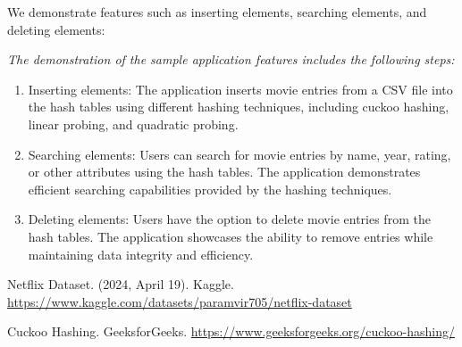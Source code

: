 \documentclass[12pt]{article}
\begin{document}
We demonstrate features such as inserting elements, searching elements, and deleting elements:

\textit{The demonstration of the sample application features includes the following steps:}

\begin{enumerate}
    \item Inserting elements: The application inserts movie entries from a CSV file into the hash tables using different hashing techniques, including cuckoo hashing, linear probing, and quadratic probing.
    
    \item Searching elements: Users can search for movie entries by name, year, rating, or other attributes using the hash tables. The application demonstrates efficient searching capabilities provided by the hashing techniques.
    
    \item Deleting elements: Users have the option to delete movie entries from the hash tables. The application showcases the ability to remove entries while maintaining data integrity and efficiency.
\end{enumerate}



\newpage
\begin{thebibliography}{2}  %
    Netflix Dataset. (2024, April 19). Kaggle.
    \url{https://www.kaggle.com/datasets/paramvir705/netflix-dataset}

    Cuckoo Hashing. GeeksforGeeks.
    \url{https://www.geeksforgeeks.org/cuckoo-hashing/}
\end{thebibliography}
\end{document}
